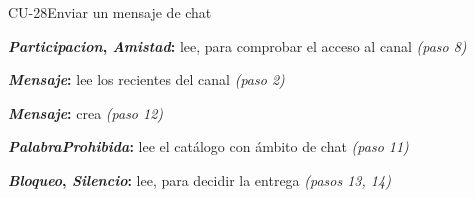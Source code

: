 \begin{fichacu}{CU-28}{Enviar un mensaje de chat}
{\begin{cudatos}
      \item \textbf{\textit{Participacion}, \textit{Amistad}:} lee, para comprobar el acceso al canal \textit{(paso 8)}
      \item \textbf{\textit{Mensaje}:} lee los recientes del canal \textit{(paso 2)}
      \item \textbf{\textit{Mensaje}:} crea \textit{(paso 12)}
      \item \textbf{\textit{PalabraProhibida}:} lee el catálogo con ámbito de chat \textit{(paso 11)}
      \item \textbf{\textit{Bloqueo}, \textit{Silencio}:} lee, para decidir la entrega \textit{(pasos 13, 14)}
    \end{cudatos}} \\ \hline
\end{fichacu}
\clearpage
